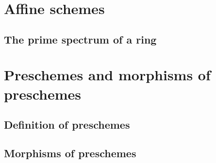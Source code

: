 \documentclass[10pt,oneside]{amsart}
\begin{document}
    \section{Affine schemes}
       
       \subsection{The prime spectrum of a ring}

    \section{Preschemes and morphisms of preschemes}

        \subsection{Definition of preschemes}
        

        \subsection{Morphisms of preschemes}
        
\end{document}
